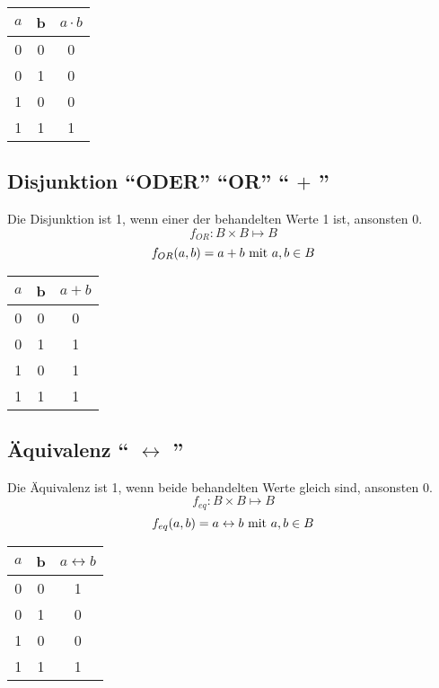 \begin{center}
\begin{tabular}{ccc}
	$a$ & b & $a \cdot b$ \\ \hline
	 0  & 0 &    0    \\
	 0  & 1 &    0    \\
	 1  & 0 &    0    \\
	 1  & 1 &    1    \\
\end{tabular}
\end{center}

\subsection{Disjunktion "`ODER"' "`OR"' "` $+$ "'}
Die Disjunktion ist 1, wenn einer der behandelten Werte 1 ist, ansonsten 0.
$$ f_{OR}: B \times B \mapsto B $$
$$ f_{OR}(a, b) = a + b \textnormal{ mit } a, b \in B$$

\begin{center}
\begin{tabular}{ccc}
	$a$ & b & $a + b$ \\ \hline
	 0  & 0 &    0    \\
	 0  & 1 &    1    \\
	 1  & 0 &    1    \\
	 1  & 1 &    1    \\
\end{tabular}
\end{center}

\subsection{Äquivalenz "` $\leftrightarrow$ "'}
Die Äquivalenz ist 1, wenn beide behandelten Werte gleich sind, ansonsten 0.
$$ f_{eq}: B \times B \mapsto B $$
$$ f_{eq}(a, b) = a \leftrightarrow b \textnormal{ mit } a, b \in B$$

\begin{center}
\begin{tabular}{ccc}
	$a$ & b & $a \leftrightarrow b$ \\ \hline
	 0  & 0 &    1    \\
	 0  & 1 &    0    \\
	 1  & 0 &    0    \\
	 1  & 1 &    1    \\
\end{tabular}
\end{center}

